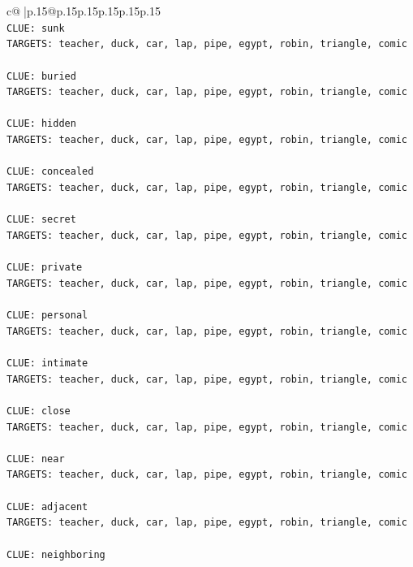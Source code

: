 \documentclass{article}
\begin{document}
{\begin{supertabular}{c@{$\;$}|p{.15\linewidth}@{}p{.15\linewidth}p{.15\linewidth}p{.15\linewidth}p{.15\linewidth}p{.15\linewidth}}
{{{\\ 
\texttt{CLUE: sunk} \\
\texttt{TARGETS: teacher, duck, car, lap, pipe, egypt, robin, triangle, comic} \\
\\ 
\texttt{CLUE: buried} \\
\texttt{TARGETS: teacher, duck, car, lap, pipe, egypt, robin, triangle, comic} \\
\\ 
\texttt{CLUE: hidden} \\
\texttt{TARGETS: teacher, duck, car, lap, pipe, egypt, robin, triangle, comic} \\
\\ 
\texttt{CLUE: concealed} \\
\texttt{TARGETS: teacher, duck, car, lap, pipe, egypt, robin, triangle, comic} \\
\\ 
\texttt{CLUE: secret} \\
\texttt{TARGETS: teacher, duck, car, lap, pipe, egypt, robin, triangle, comic} \\
\\ 
\texttt{CLUE: private} \\
\texttt{TARGETS: teacher, duck, car, lap, pipe, egypt, robin, triangle, comic} \\
\\ 
\texttt{CLUE: personal} \\
\texttt{TARGETS: teacher, duck, car, lap, pipe, egypt, robin, triangle, comic} \\
\\ 
\texttt{CLUE: intimate} \\
\texttt{TARGETS: teacher, duck, car, lap, pipe, egypt, robin, triangle, comic} \\
\\ 
\texttt{CLUE: close} \\
\texttt{TARGETS: teacher, duck, car, lap, pipe, egypt, robin, triangle, comic} \\
\\ 
\texttt{CLUE: near} \\
\texttt{TARGETS: teacher, duck, car, lap, pipe, egypt, robin, triangle, comic} \\
\\ 
\texttt{CLUE: adjacent} \\
\texttt{TARGETS: teacher, duck, car, lap, pipe, egypt, robin, triangle, comic} \\
\\ 
\texttt{CLUE: neighboring} \\
}}}
\end{supertabular}}
\end{document}
